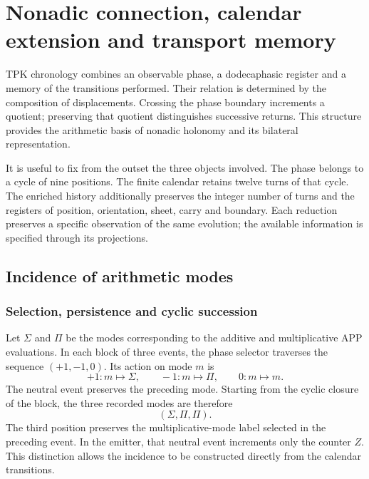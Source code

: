 \section{Nonadic connection, calendar extension and transport memory}
\label{cap:calendario}

TPK chronology combines an observable phase, a dodecaphasic register
and a memory of the transitions performed. Their relation is determined by
the composition of displacements. Crossing the phase boundary
increments a quotient; preserving that quotient distinguishes
successive returns. This structure provides the arithmetic basis of
nonadic holonomy and its bilateral representation.

It is useful to fix from the outset the three objects involved. The phase
belongs to a cycle of nine positions. The finite calendar retains twelve
turns of that cycle. The enriched history additionally preserves the integer
number of turns and the registers of position, orientation, sheet, carry and
boundary. Each reduction preserves a specific observation of the same
evolution; the available information is specified through its projections.

\subsection{Incidence of arithmetic modes}
\label{sec:cal-incidencia}

\subsubsection{Selection, persistence and cyclic succession}

Let $\Sigma$ and $\Pi$ be the modes corresponding to the additive
and multiplicative APP evaluations. In each block of three
events, the phase selector traverses the sequence $(+1,-1,0)$. Its action on mode $m$ is
\[
 +1:m\longmapsto\Sigma,\qquad
 -1:m\longmapsto\Pi,\qquad
 0:m\longmapsto m.
\]
The neutral event preserves the preceding mode. Starting from the cyclic closure
of the block, the three recorded modes are therefore
\[
 (\Sigma,\Pi,\Pi).
\]
The third position preserves the multiplicative-mode label
selected in the preceding event. In the emitter, that neutral event
increments only the counter $Z$. This distinction allows
the incidence to be constructed directly from the calendar transitions.

